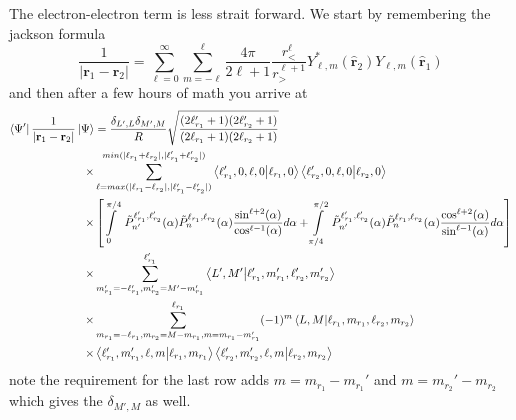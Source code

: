 The electron-electron term is less strait forward. We start by remembering the jackson formula
\begin{equation}
  \frac{1}{|\mathbf{r}_1-\mathbf{r}_2|} = \sum_{\ell=0}^\infty \sum_{m=-\ell}^\ell \frac{4\pi}{2\ell+1} \frac{r_<^\ell}{r_>^{\ell+1}} Y^*_{\ell,m}(\hat{\mathbf{r}}_2)Y_{\ell,m}(\hat{\mathbf{r}}_1)
\end{equation}
and then after a few hours of math you arrive at 
\begin{align}
  \bra{\Psi'}\frac{1}{|\mathbf{r}_1-\mathbf{r}_2|}\ket{\Psi} &= \frac{\delta_{L',L}\delta_{M',M}}{R} \sqrt{\frac{(2\ell_{r_1}'+1)(2\ell_{r_2}'+1)}{(2\ell_{r_1}+1)(2\ell_{r_2}+1)}}\\
  \times& \sum_{\ell=max(|\ell_{r_1}-\ell_{r_2}|,|\ell_{r_1}'-\ell_{r_2}'|)}^{min(|\ell_{r_1}+\ell_{r_2}|,|\ell_{r_1}'+\ell_{r_2}'|)} \bra{\ell_{r_1}',0,\ell,0}\ket{\ell_{r_1},0} \bra{\ell_{r_2}',0,\ell,0}\ket{\ell_{r_2},0} \\
  \times& \left[\int\limits_0^{\pi/4}\ \tilde{P}^{\ell_{r_1}',\ell_{r_2}'}_{n'}(\alpha) \tilde{P}^{\ell_{r_1},\ell_{r_2}}_{n}(\alpha) \frac{\sin^{\ell+2}(\alpha)}{\cos^{\ell-1}(\alpha)}d\alpha + \int\limits_{\pi/4}^{\pi/2}\ \tilde{P}^{\ell_{r_1}',\ell_{r_2}'}_{n'}(\alpha) \tilde{P}^{\ell_{r_1},\ell_{r_2}}_{n}(\alpha) \frac{\cos^{\ell+2}(\alpha)}{\sin^{\ell-1}(\alpha)}d\alpha\right]\\
  \times& \sum_{m_{r_1}'=-\ell_{r_1}', m_{r_2}' = M'-m_{r_1}'}^{\ell_{r_1}'} \bra{L',M'}\ket{\ell_{r_1}',m_{r_1}',\ell_{r_2}',m_{r_2}'}\\
  \times& \sum_{m_{r_1}=-\ell_{r_1}, m_{r_2} = M-m_{r_1}, m = m_{r_1}-m_{r_1}'}^{\ell_{r_1}} (-1)^m \bra{L,M}\ket{\ell_{r_1},m_{r_1},\ell_{r_2},m_{r_2}}\\
  \times& \bra{\ell_{r_1}',m_{r_1}',\ell,m}\ket{\ell_{r_1},m_{r_1}} \bra{\ell_{r_2}',m_{r_2}',\ell,m}\ket{\ell_{r_2},m_{r_2}}
\end{align}
note the requirement for the last row adds $m=m_{r_1}-m_{r_1}'$ and $m=m_{r_2}'-m_{r_2}$ which gives the $\delta_{M',M}$ as well.

